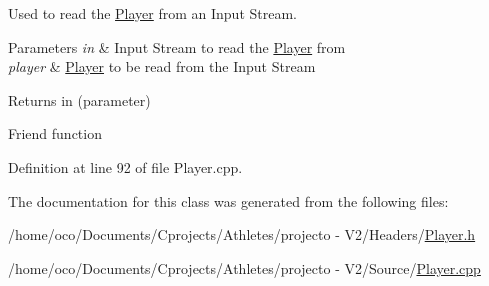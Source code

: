 Used to read the \hyperlink{class_player}{Player} from an Input Stream. 


\begin{DoxyParams}{Parameters}
{\em in} & Input Stream to read the \hyperlink{class_player}{Player} from \\
\hline
{\em player} & \hyperlink{class_player}{Player} to be read from the Input Stream \\
\hline
\end{DoxyParams}
\begin{DoxyReturn}{Returns}
in (parameter)
\end{DoxyReturn}
Friend function 

Definition at line 92 of file Player.\+cpp.



The documentation for this class was generated from the following files\+:\begin{DoxyCompactItemize}
\item 
/home/oco/\+Documents/\+Cprojects/\+Athletes/projecto -\/ V2/\+Headers/\hyperlink{_player_8h}{Player.\+h}\item 
/home/oco/\+Documents/\+Cprojects/\+Athletes/projecto -\/ V2/\+Source/\hyperlink{_player_8cpp}{Player.\+cpp}\end{DoxyCompactItemize}
